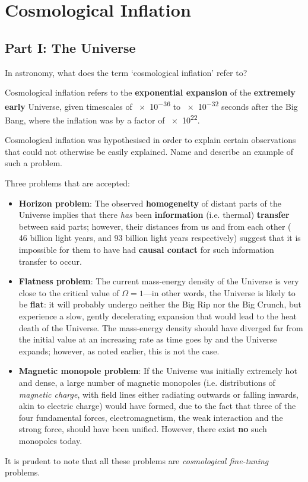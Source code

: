 \documentclass[a4paper,11pt]{exam}
\begin{document}
\newpage
\section{Cosmological Inflation}

\subsection*{Part I: The Universe}
\begin{questions}
\question[1] 
	In astronomy, what does the term `cosmological inflation' refer to?
	\droppoints
	\begin{solution}
		Cosmological inflation refers to the \textbf{exponential expansion} of the \textbf{extremely early} Universe, given timescales of \num{e-36} to \num{e-32} seconds after the Big Bang, where the inflation was by a factor of \num{e22}.
	\end{solution}

\question[2]\label{1b} 
	Cosmological inflation was hypothesised in order to explain certain observations that could not otherwise be easily explained. Name and describe an example of such a problem. 
	\droppoints
	\begin{solution}
		Three problems that are accepted:
		\begin{itemize}[leftmargin=10pt]
			\item \textbf{Horizon problem}: The observed \textbf{homogeneity} of distant parts of the Universe implies that there \textit{has} been \textbf{information} (i.e. thermal) \textbf{transfer} between said parts; however, their distances from us and from each other (~ 46 billion light years, and 93 billion light years respectively) suggest that it is impossible for them to have had \textbf{causal contact} for such information transfer to occur. 
			\item \textbf{Flatness problem}: The current mass-energy density of the Universe is very close to the critical value of $ \Omega = 1$---in other words, the Universe is likely to be \textbf{flat}: it will probably undergo neither the Big Rip nor the Big Crunch, but experience a slow, gently decelerating expansion that would lead to the heat death of the Universe. The mass-energy density should have diverged far from the initial value at an increasing rate as time goes by and the Universe expands; however, as noted earlier, this is not the case.
			\item \textbf{Magnetic monopole problem}: If the Universe was initially extremely hot and dense, a large number of magnetic monopoles (i.e. distributions of \textit{magnetic charge}, with field lines either radiating outwards or falling inwards, akin to electric charge) would have formed, due to the fact that three of the four fundamental forces, electromagnetism, the weak interaction and the strong force, should have been unified. However, there exist \textbf{no} such monopoles today.
		\end{itemize}
		It is prudent to note that all these problems are \textit{cosmological fine-tuning} problems.
	\end{solution}


\end{questions}
\end{document}
